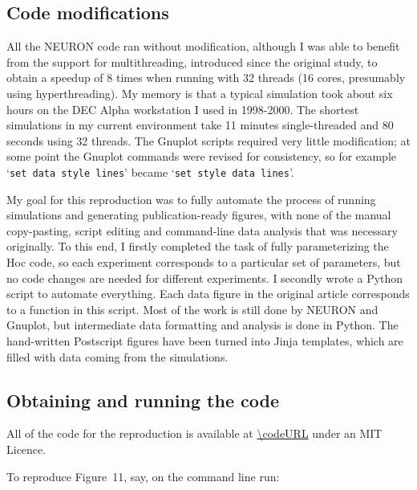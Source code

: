 
\subsection{Code modifications}

All the NEURON code ran without modification, although I was able to benefit from the support for multithreading, introduced since the original study,
 to obtain a speedup of 8 times when running with 32 threads (16 cores, presumably using hyperthreading).
My memory is that a typical simulation took about six hours on the DEC Alpha workstation I used in 1998-2000.
The shortest simulations in my current environment take 11 minutes single-threaded and 80 seconds using 32 threads.
The Gnuplot scripts required very little modification; at some point the Gnuplot commands were revised for consistency, so for example `\lstinline|set data style lines|' became `\lstinline|set style data lines|'.

\vspace{2mm}

My goal for this reproduction was to fully automate the process of running simulations and generating publication-ready figures,
with none of the manual copy-pasting, script editing and command-line data analysis that was necessary originally.
To this end, I firstly completed the task of fully parameterizing the Hoc code, so each experiment corresponds to a particular set of parameters, but no code changes are needed for different experiments.
I secondly wrote a Python script to automate everything. Each data figure in the original article corresponds to a function in this script.
Most of the work is still done by NEURON and Gnuplot, but intermediate data formatting and analysis is done in Python.
The hand-written Postscript figures have been turned into Jinja templates, which are filled with data coming from the simulations.

\subsection{Obtaining and running the code}

\begin{sloppypar}
All of the code for the reproduction is available at \url{\codeURL} under an MIT Licence.
\end{sloppypar}

To reproduce Figure~11, say, on the command line run:

